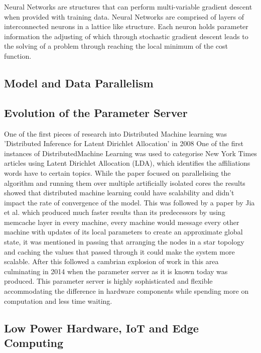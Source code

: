 Neural Networks are structures that can perform multi-variable gradient descent
when provided with training data. Neural Networks are comprised of layers of
interconnected neurons in a lattice like structure. Each neuron holds parameter
information the adjusting of which through stochastic gradient descent leads to
the solving of a problem through reaching the local minimum of the cost
function.

\subsection{Model and Data Parallelism}

\subsection{Evolution of the Parameter Server}
One of the first pieces of research into Distributed Machine learning was
’Distributed Inference for Latent Dirichlet Allocation’ in 2008
\cite{newman2008distributed} One of the first instances of DistributedMachine
Learning  was  used  to  categorise  New York  Times  articles  using  Latent
Dirichlet Allocation (LDA), which identifies the affiliations words have to
certain topics.  While the paper focused on parallelising the algorithm and
running them over multiple artificially isolated cores the results showed that
distributed machine learning could have scalability and didn’t impact the rate
of convergence of the model.  This was followed by a paper by Jia et al.
\cite{ParallelTopicModels} which produced much faster results than its
predecessors by using memcache layer in every machine, every machine would
message every other machine with updates of its local parameters to create an
approximate global state, it was mentioned in passing that arranging the nodes
in a star topology and caching the values that passed through it could make the
system more scalable. After this followed a cambrian explosion of work in this
area \cite{Ahmed2012YahooLDA, li2014communication, Dean2012Distbelief,
googlemapreduce2008} culminating in 2014 when the parameter server as it is
known today \cite{LI2014ParameterServers} was produced. This parameter server is
highly sophisticated and flexible accommodating the difference in hardware
components while spending more on computation and less time waiting.


\subsection{Low Power Hardware, IoT and Edge Computing}
